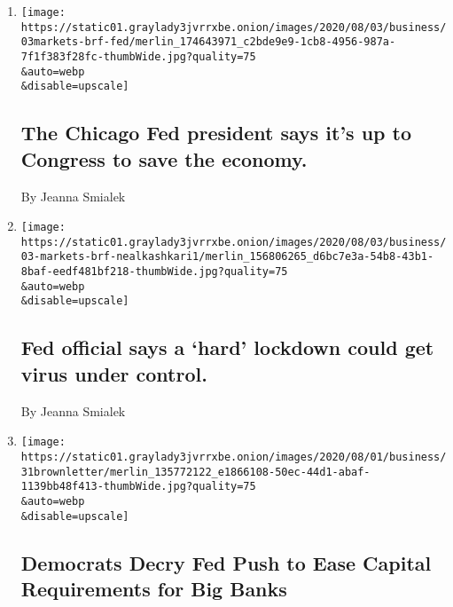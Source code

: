 \begin{enumerate}
\def\labelenumi{\arabic{enumi}.}
\item
  \href{/live/2020/08/03/business/stock-market-today-coronavirus/the-chicago-fed-president-says-its-up-to-congress-to-save-the-economy}{}

  \texttt{[image: https://static01.graylady3jvrrxbe.onion/images/2020/08/03/business/03markets-brf-fed/merlin\_174643971\_c2bde9e9-1cb8-4956-987a-7f1f383f28fc-thumbWide.jpg?quality=75\\\&auto=webp\\\&disable=upscale]}

  \hypertarget{the-chicago-fed-president-says-its-up-to-congress-to-save-the-economy}{%
  \subsection{The Chicago Fed president says it's up to Congress to save
  the
  economy.}\label{the-chicago-fed-president-says-its-up-to-congress-to-save-the-economy}}

  By Jeanna Smialek
\item
  \href{/2020/08/03/business/fed-official-says-a-hard-lockdown-could-get-virus-under-control.html}{}

  \texttt{[image: https://static01.graylady3jvrrxbe.onion/images/2020/08/03/business/03-markets-brf-nealkashkari1/merlin\_156806265\_d6bc7e3a-54b8-43b1-8baf-eedf481bf218-thumbWide.jpg?quality=75\\\&auto=webp\\\&disable=upscale]}

  \hypertarget{fed-official-says-a-hard-lockdown-could-get-virus-under-control}{%
  \subsection{Fed official says a `hard' lockdown could get virus under
  control.}\label{fed-official-says-a-hard-lockdown-could-get-virus-under-control}}

  By Jeanna Smialek
\item
  \href{/2020/07/31/business/democrats-fed-banks-capital-requirements.html}{}

  \texttt{[image: https://static01.graylady3jvrrxbe.onion/images/2020/08/01/business/31brownletter/merlin\_135772122\_e1866108-50ec-44d1-abaf-1139bb48f413-thumbWide.jpg?quality=75\\\&auto=webp\\\&disable=upscale]}

  \hypertarget{democrats-decry-fed-push-to-ease-capital-requirements-for-big-banks}{%
  \subsection{Democrats Decry Fed Push to Ease Capital Requirements for
  Big
  Banks}\label{democrats-decry-fed-push-to-ease-capital-requirements-for-big-banks}}


\end{enumerate}
